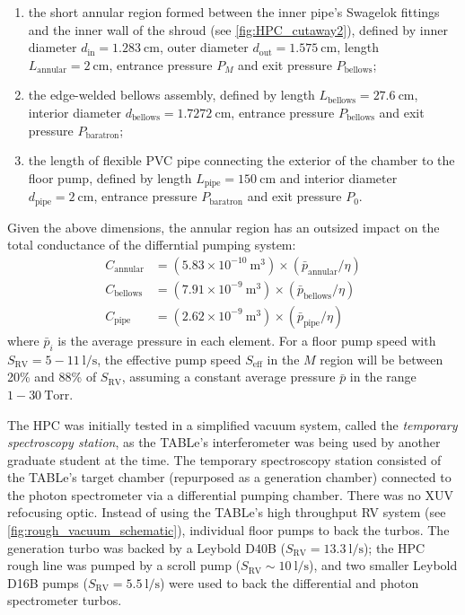 \begin{enumerate}
	\item the short annular region formed between the inner pipe's Swagelok fittings and the inner wall of the shroud (see \cref{fig:HPC_cutaway2}), defined by inner diameter $d_{\textrm{in}} = 1.283 \ \textrm{cm}$, outer diameter $d_{\textrm{out}} = 1.575 \ \textrm{cm}$, length $L_{\textrm{annular}} = 2 \ \textrm{cm}$, entrance pressure $P_M$ and exit pressure $P_{\textrm{bellows}}$;
	\item the edge-welded bellows assembly, defined by length $L_{\textrm{bellows}} = 27.6 \ \textrm{cm}$, interior diameter $d_{\textrm{bellows}} = 1.7272 \ \textrm{cm}$, entrance pressure $P_{\textrm{bellows}}$ and exit pressure $P_{\textrm{baratron}}$;
	\item the length of flexible PVC pipe connecting the exterior of the chamber to the floor pump, defined by length $L_{\textrm{pipe}} = 150 \ \textrm{cm}$ and interior diameter $d_{\textrm{pipe}} = 2 \ \textrm{cm}$, entrance pressure $P_{\textrm{baratron}}$ and exit pressure $P_0$.
\end{enumerate}

Given the above dimensions, the annular region has an outsized impact on the total conductance of the differntial pumping system:
\begin{equation*}
\begin{aligned}
C_{\textrm{annular}} &= (5.83 \times 10^{-10} \ \textrm{m}^{3}) \times (\bar{p}_{\textrm{annular}}/\eta) \\
C_{\textrm{bellows}} &= (7.91 \times 10^{-9} \ \textrm{m}^{3}) \times (\bar{p}_{\textrm{bellows}}/\eta) \\
C_{\textrm{pipe}} &= (2.62 \times 10^{-9} \ \textrm{m}^{3}) \times (\bar{p}_{\textrm{pipe}}/\eta)
\end{aligned}
\end{equation*}
where $\bar{p}_i$ is the average pressure in each element. For a floor pump speed with ${S_{\textrm{RV}} = 5 - 11 \ \textrm{l/s}}$, the effective pump speed $S_{\textrm{eff}}$ in the $M$ region will be between 20\% and 88\% of $S_{\textrm{RV}}$, assuming a constant average pressure $\bar{p}$ in the range ${1 - 30 \ \textrm{Torr}}$.

The HPC was initially tested in a simplified vacuum system, called the \textit{temporary spectroscopy station}, as the TABLe's interferometer was being used by another graduate student at the time. The temporary spectroscopy station consisted of the TABLe's target chamber (repurposed as a generation chamber) connected to the photon spectrometer via a differential pumping chamber. There was no XUV refocusing optic. Instead of using the TABLe's high throughput RV system (see \cref{fig:rough_vacuum_schematic}), individual floor pumps to back the turbos. The generation turbo was backed by a Leybold D40B ($S_{\textrm{RV}} = 13.3 \ \textrm{l/s}$); the HPC rough line was pumped by a scroll pump ($S_{\textrm{RV}} \sim 10 \ \textrm{l/s}$), and two smaller Leybold D16B pumps ($S_{\textrm{RV}} = 5.5 \ \textrm{l/s}$) were used to back the differential and photon spectrometer turbos.


